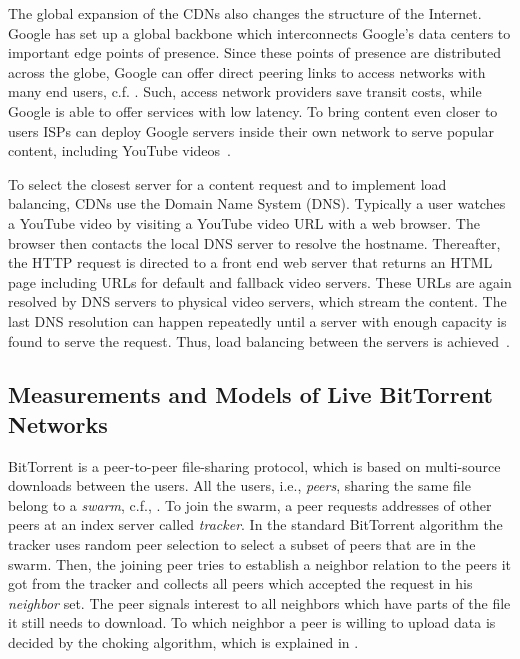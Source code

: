 The global expansion of the CDNs also changes the structure of the Internet.
Google has set up a global backbone which interconnects Google's data centers to important edge points of presence.
Since these points of presence are distributed across the globe, Google can offer direct peering links to access networks with many end users, c.f. .
Such, access network providers save transit costs, while Google is able to offer services with low latency.
To bring content even closer to users ISPs can deploy Google servers inside their own network to serve popular content, including YouTube videos~\cite{gcc}.

To select the closest server for a content request and to implement load balancing, CDNs use the Domain Name System (DNS).
Typically a user watches a YouTube video by visiting a YouTube video URL with a web browser.
The browser then contacts the local DNS server to resolve the hostname.
Thereafter, the HTTP request is directed to a front end web server that returns an HTML page including URLs for default and fallback video servers.
These URLs are again resolved by DNS servers to physical video servers, which stream the content.
The last DNS resolution can happen repeatedly until a server with enough capacity is found to serve the request.
Thus, load balancing between the servers is achieved~\cite{adhikari2012vivisecting}.

\subsection{Measurements and Models of Live BitTorrent Networks}

BitTorrent is a peer-to-peer file-sharing protocol, which is based on multi-source downloads between the users. All the users, i.e., \textit{peers}, sharing the same file belong to a \textit{swarm}, c.f., . To join the swarm, a peer requests addresses of other peers at an index server called \textit{tracker}. In the standard BitTorrent algorithm the tracker uses random peer selection to select a subset of peers that are in the swarm. Then, the joining peer tries to establish a neighbor relation to the peers it got from the tracker and collects all peers which accepted the request in his \textit{neighbor} set. The peer signals interest to all neighbors which have parts of the file it still needs to download. To which neighbor a peer is willing to upload data is decided by the choking algorithm, which is explained in \cite{cohen:bt}.

